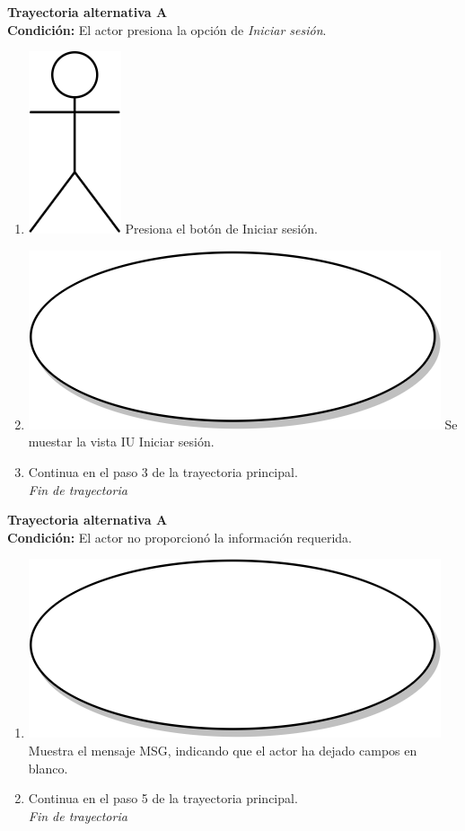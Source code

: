 \textbf{Trayectoria alternativa A} \label{cu2_ta_a} \\
\textbf{Condición:} El actor presiona la opción de \textit{Iniciar sesión}.\\
 \begin{enumerate}[label=A\arabic*]
  \item {\includegraphics[scale=.1]{Capitulo3/img/actor.png} Presiona el botón de Iniciar sesión.}
  \item {\includegraphics[scale=.05]{Capitulo3/img/proceso.png} Se muestar la vista IU Iniciar sesión.}
    \item {Continua en el paso 3 de la trayectoria principal.} \\
    \textit{Fin de trayectoria} \\
\end{enumerate}

\textbf{Trayectoria alternativa A} \label{cu2_ta_a} \\
\textbf{Condición:} El actor no proporcionó la información requerida.\\
 \begin{enumerate}[label=A\arabic*]
    \item {\includegraphics[scale=.05]{Capitulo3/img/proceso.png} Muestra el mensaje MSG, indicando que el actor ha dejado campos en blanco.}
    \item {Continua en el paso 5 de la trayectoria principal.} \\
    \textit{Fin de trayectoria} \\
\end{enumerate}

